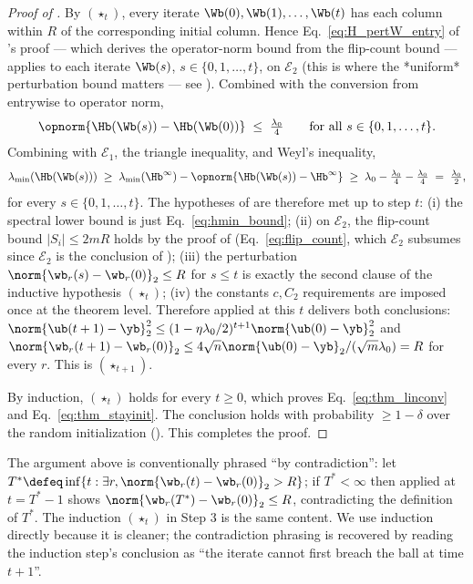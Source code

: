 \begin{proof}[Proof of ]
By $(\star_t)$, every iterate $\Wb(0), \Wb(1), \ldots, \Wb(t)$ has each column within $R$ of the corresponding initial column. Hence Eq.~\eqref{eq:H_pertW_entry} of 's proof — which derives the operator-norm bound from the flip-count bound — applies to each iterate $\Wb(s)$, $s \in \{0, 1, \ldots, t\}$, on $\mathcal E_2$ (this is where the *uniform* perturbation bound matters — see ). Combined with the conversion from entrywise to operator norm,
\begin{align*}
\opnorm{ \Hb(\Wb(s)) - \Hb(\Wb(0)) } \;\le\; \tfrac{\lambda_0}{4} \qquad \text{for all } s \in \{0, 1, \ldots, t\}.
\end{align*}
Combining with $\mathcal E_1$, the triangle inequality, and Weyl's inequality,
\begin{align}\label{eq:hmin_bound}
\lambda_{\min}(\Hb(\Wb(s)))
\;\ge\; \lambda_{\min}(\Hb^\infty) - \opnorm{\Hb(\Wb(s)) - \Hb^\infty}
\;\ge\; \lambda_0 - \tfrac{\lambda_0}{4} - \tfrac{\lambda_0}{4}
\;=\; \tfrac{\lambda_0}{2},
\end{align}
for every $s \in \{0, 1, \ldots, t\}$. The hypotheses of  are therefore met up to step $t$: (i) the spectral lower bound is just Eq.~\eqref{eq:hmin_bound}; (ii) on $\mathcal E_2$, the flip-count bound $|S_i| \le 2 m R$ holds by the proof of  (Eq.~\eqref{eq:flip_count}, which $\mathcal E_2$ subsumes since $\mathcal E_2$ is the conclusion of ); (iii) the perturbation $\norm{\wb_r(s) - \wb_r(0)}_2 \le R$ for $s \le t$ is exactly the second clause of the inductive hypothesis $(\star_t)$; (iv) the constants $c, C_2$ requirements are imposed once at the theorem level. Therefore  applied at this $t$ delivers both conclusions: $\norm{\ub(t+1) - \yb}_2^2 \le (1 - \eta\lambda_0/2)^{t+1} \norm{\ub(0) - \yb}_2^2$ and $\norm{\wb_r(t+1) - \wb_r(0)}_2 \le 4 \sqrt n \norm{\ub(0) - \yb}_2 / (\sqrt m \lambda_0) = R$ for every $r$. This is $(\star_{t+1})$.

By induction, $(\star_t)$ holds for every $t \ge 0$, which proves Eq.~\eqref{eq:thm_linconv} and Eq.~\eqref{eq:thm_stayinit}. The conclusion holds with probability $\ge 1 - \delta$ over the random initialization (). This completes the proof.
\end{proof}

\begin{remark}\label{rem:contradiction}
The argument above is conventionally phrased ``by contradiction'': let $T^* \defeq \inf\{ t : \exists r, \norm{\wb_r(t) - \wb_r(0)}_2 > R \}$; if $T^* < \infty$ then  applied at $t = T^* - 1$ shows $\norm{\wb_r(T^*) - \wb_r(0)}_2 \le R$, contradicting the definition of $T^*$. The induction $(\star_t)$ in Step 3 is the same content. We use induction directly because it is cleaner; the contradiction phrasing is recovered by reading the induction step's conclusion as ``the iterate cannot first breach the ball at time $t+1$''.
\end{remark}

